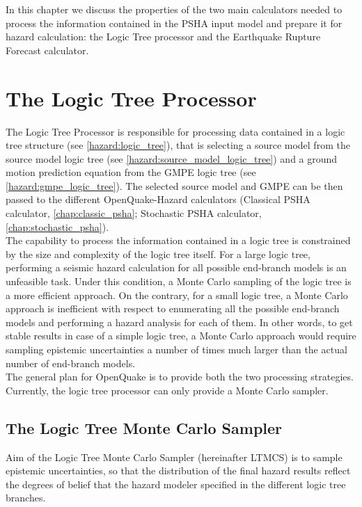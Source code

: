 In this chapter we discuss the properties of the two main calculators 
needed to process the information contained in the PSHA input model 
and prepare it for hazard calculation: the Logic Tree processor and the 
Earthquake Rupture Forecast calculator. 

\section{The Logic Tree Processor}
\label{hazard:logic_tree_processor}
%
The Logic Tree Processor is responsible for processing data contained in a 
logic tree structure (see \ref{hazard:logic_tree}), that is selecting a 
source model from the source model logic tree (see 
\ref{hazard:source_model_logic_tree}) and a ground motion prediction equation 
from the GMPE logic tree (see \ref{hazard:gmpe_logic_tree}). The selected 
source model and GMPE can be then passed to the different OpenQuake-Hazard 
calculators (Classical PSHA calculator, \ref{chap:classic_psha}; Stochastic 
PSHA calculator, \ref{chap:stochastic_psha}).\\
The capability to process the information contained in a logic tree is 
constrained by the size and complexity of the logic tree itself. For a 
large logic tree, performing a seismic hazard calculation for all possible 
end-branch models is an unfeasible task. Under this condition, a Monte Carlo
sampling of the logic tree is a more efficient approach. On the contrary, 
for a small logic tree, a Monte Carlo approach is inefficient with respect
to enumerating all the possible end-branch models and performing a hazard 
analysis for each of them. In other words, to get stable results in case of 
a simple logic tree,  a Monte Carlo approach would require sampling epistemic
uncertainties a number of times much larger than the actual number of 
end-branch models.\\
The general plan for OpenQuake is to provide both the two processing strategies. 
Currently, the logic tree processor can only provide a Monte Carlo sampler.
%
\subsection{The Logic Tree Monte Carlo Sampler}
Aim of the Logic Tree Monte Carlo Sampler (hereinafter LTMCS) is to sample 
epistemic uncertainties, so that the distribution of the final hazard results
reflect the degrees of belief that the hazard modeler specified in the 
different logic tree branches.\\
%
